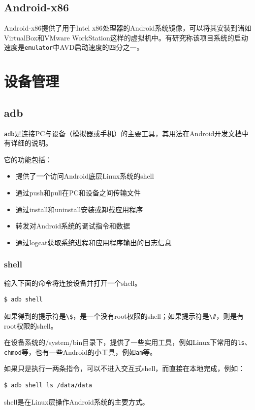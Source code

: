 \subsection{Android-x86}
Android-x86\cite{url:android_x86}提供了用于Intel x86处理器的Android系统镜像，可以将其安装到诸如VirtualBox和VMware WorkStation这样的虚拟机中。有研究称该项目系统的启动速度是\lstinline!emulator!中AVD启动速度的四分之一。

\section{设备管理}
\subsection{adb}
\lstinline!adb!是连接PC与设备（模拟器或手机）的主要工具，其用法在Android开发文档中有详细的说明\cite{url:android_adb}。

它的功能包括：
\begin{itemize}
\item 提供了一个访问Android底层Linux系统的shell
\item 通过push和pull在PC和设备之间传输文件
\item 通过install和uninstall安装或卸载应用程序
\item 转发对Android系统的调试指令和数据
\item 通过logcat获取系统进程和应用程序输出的日志信息
\end{itemize}

\subsubsection{shell}
输入下面的命令将连接设备并打开一个shell。
\begin{lstlisting}[numbers=none]
 $ adb shell
\end{lstlisting}
如果得到的提示符是\lstinline!\$!，是一个没有root权限的shell；如果提示符是\lstinline!\#!，则是有root权限的shell。

在设备系统的/system/bin目录下，提供了一些实用工具，例如Linux下常用的\lstinline!ls!、\lstinline!chmod!等，也有一些Android的小工具，例如\lstinline!am!等。

如果只是执行一两条指令，可以不进入交互式shell，而直接在本地完成，例如：
\begin{lstlisting}[numbers=none]
 $ adb shell ls /data/data
\end{lstlisting}

shell是在Linux层操作Android系统的主要方式。

